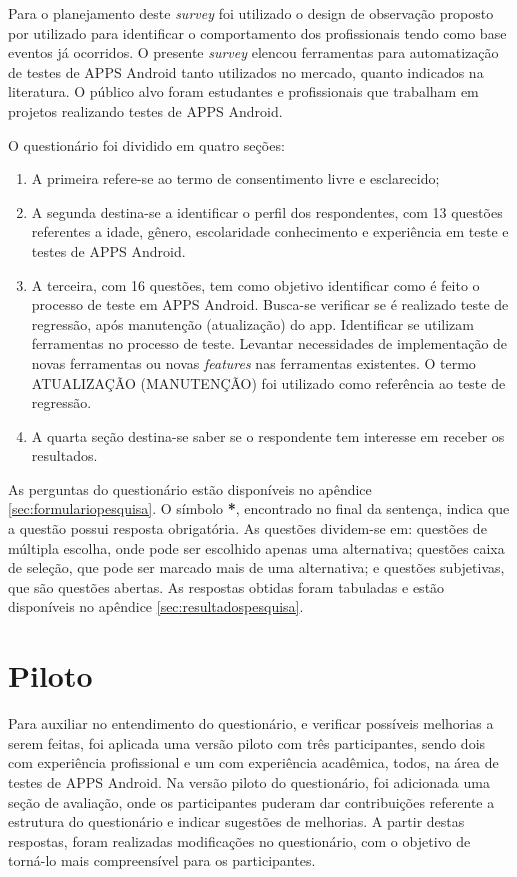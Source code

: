 Para o planejamento deste \textit{survey} foi utilizado o design de observação proposto por \cite{Kitchenham:2002:PSR:566493.566495} utilizado para identificar o comportamento dos profissionais tendo como base eventos já ocorridos. O presente \textit{survey} elencou ferramentas para automatização de testes de \ac{APPS} Android tanto utilizados no mercado, quanto indicados na literatura. O público alvo foram estudantes e profissionais que trabalham em projetos realizando testes de \ac{APPS} Android. 

O questionário foi dividido em quatro seções:
\begin{enumerate}
    \item A primeira refere-se ao termo de consentimento livre e esclarecido;
    \item A segunda destina-se a identificar o perfil dos respondentes, com 13 questões referentes a idade, gênero, escolaridade conhecimento e experiência em teste e testes de \ac{APPS} Android.
    \item A terceira, com 16 questões, tem como objetivo identificar como é feito o processo de teste em \ac{APPS} Android. Busca-se verificar se é realizado teste de regressão, após manutenção (atualização) do app. Identificar se utilizam ferramentas no processo de teste. Levantar necessidades de implementação de novas ferramentas ou novas \textit{features} nas ferramentas existentes. O termo ATUALIZAÇÃO (MANUTENÇÃO) foi utilizado como referência ao teste de regressão.
    \item A quarta seção destina-se saber se o respondente tem interesse em receber os resultados.
\end{enumerate}

As perguntas do questionário estão disponíveis no apêndice \ref{sec:formulariopesquisa}. O símbolo \textbf{*}, encontrado no final da sentença, indica que a questão possui resposta obrigatória. As questões dividem-se em: questões de múltipla escolha, onde pode ser escolhido apenas uma alternativa; questões caixa de seleção, que pode ser marcado mais de uma alternativa; e questões subjetivas, que são questões abertas. As respostas obtidas foram tabuladas e estão disponíveis no apêndice \ref{sec:resultadospesquisa}. 

\section{Piloto}

Para auxiliar no entendimento do questionário, e verificar possíveis melhorias a serem feitas, foi aplicada uma versão piloto com três participantes, sendo dois com experiência profissional e um com experiência acadêmica, todos, na área de testes de \ac{APPS} Android. Na versão piloto do questionário, foi adicionada uma seção de avaliação, onde os participantes puderam dar contribuições referente a estrutura do questionário e indicar sugestões de melhorias. A partir destas respostas, foram realizadas modificações no questionário, com o objetivo de torná-lo mais compreensível para os participantes.


